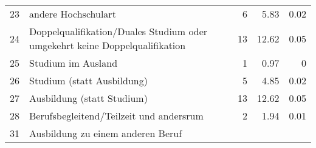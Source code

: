 \begin{longtable}{lXrrr}
     23 &
     \multicolumn{1}{X}{ andere Hochschulart   } &


       \num{6} &
       \num[round-mode=places,round-precision=2]{5.83} &
         \num[round-mode=places,round-precision=2]{0.02} \\

     24 &
     \multicolumn{1}{X}{ Doppelqualifikation/Duales Studium oder umgekehrt keine Doppelqualifikation   } &


       \num{13} &
       \num[round-mode=places,round-precision=2]{12.62} &
         \num[round-mode=places,round-precision=2]{0.05} \\

     25 &
     \multicolumn{1}{X}{ Studium im Ausland   } &


       \num{1} &
       \num[round-mode=places,round-precision=2]{0.97} &
         \num[round-mode=places,round-precision=2]{0} \\

     26 &
     \multicolumn{1}{X}{ Studium (statt Ausbildung)   } &


       \num{5} &
       \num[round-mode=places,round-precision=2]{4.85} &
         \num[round-mode=places,round-precision=2]{0.02} \\

     27 &
     \multicolumn{1}{X}{ Ausbildung (statt Studium)   } &


       \num{13} &
       \num[round-mode=places,round-precision=2]{12.62} &
         \num[round-mode=places,round-precision=2]{0.05} \\

     28 &
     \multicolumn{1}{X}{ Berufsbegleitend/Teilzeit und andersrum   } &


       \num{2} &
       \num[round-mode=places,round-precision=2]{1.94} &
         \num[round-mode=places,round-precision=2]{0.01} \\

     31 &
     \multicolumn{1}{X}{ Ausbildung zu einem anderen Beruf   } &



\end{longtable}
